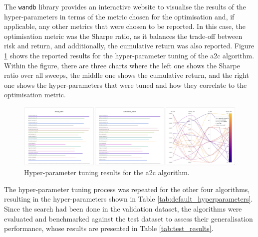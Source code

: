 The \texttt{wandb} library provides an interactive website to visualise the results of the hyper-parameters in terms of the metric chosen for the optimisation and, if applicable, any other metrics that were chosen to be reported. In this case, the optimisation metric was the Sharpe ratio, as it balances the trade-off between risk and return, and additionally, the cumulative return was also reported. Figure \ref{fig:a2c_hyperparameter_tuning} shows the reported results for the hyper-parameter tuning of the \acrshort{a2c} algorithm. Within the figure, there are three charts where the left one shows the Sharpe ratio over all sweeps, the middle one shows the cumulative return, and the right one shows the hyper-parameters that were tuned and how they correlate to the optimisation metric.

\begin{figure}[h]
\centering
\includegraphics[width=\textwidth]{figures/a2c_hyperparameter_tuning.png}
\caption{Hyper-parameter tuning results for the \acrshort{a2c} algorithm. }
\label{fig:a2c_hyperparameter_tuning}
\end{figure}

The hyper-parameter tuning process was repeated for the other four algorithms, resulting in the hyper-parameters shown in Table \ref{tab:default_hyperparameters}. Since the search had been done in the validation dataset, the algorithms were evaluated and benchmarked against the test dataset to assess their generalisation performance, whose results are presented in Table \ref{tab:test_results}.

